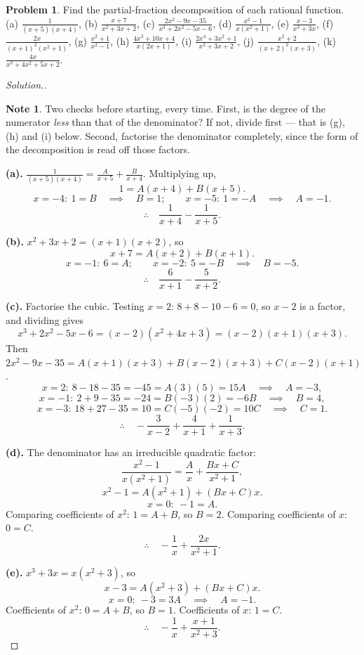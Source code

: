 \documentclass[11pt,a4paper]{article}
\theoremstyle{definition}
\newtheorem{note}[thm]{Note}
\newtheorem{problemx}{Problem}[section]
\newenvironment{problem}{\begin{problemx}}{\end{problemx}}
\newenvironment{solution}
  {\renewcommand{\qedsymbol}{}\begin{proof}[\textit{Solution}.]}
  {\end{proof}}
\begin{document}
\begin{problem}
Find the partial-fraction decomposition of each rational function.
\quad (a) $\frac{1}{(x+5)(x+4)}$, \quad (b) $\frac{x+7}{x^2+3x+2}$, \quad
(c) $\frac{2x^2-9x-35}{x^3+2x^2-5x-6}$, \quad (d) $\frac{x^2-1}{x\left(x^2+1\right)}$,
\quad (e) $\frac{x-3}{x^3+3x}$, \quad
(f) $\frac{2x}{(x+1)^2\left(x^2+1\right)}$, \quad (g) $\frac{x^2+1}{x^2-1}$, \quad
(h) $\frac{4x^3+10x+4}{x(2x+1)}$, \quad (i) $\frac{2x^4+3x^2+1}{x^2+3x+2}$, \quad
(j) $\frac{x^2+2}{(x+2)^2(x+3)}$, \quad (k) $\frac{4x}{x^3+4x^2+5x+2}$.
\end{problem}

\begin{solution}
\begin{note}
Two checks before starting, every time. First, is the degree of the numerator
\emph{less} than that of the denominator? If not, divide first --- that is (g), (h) and
(i) below. Second, factorise the denominator completely, since the form of the
decomposition is read off those factors.
\end{note}

\textbf{(a).} $\frac{1}{(x+5)(x+4)}=\frac{A}{x+5}+\frac{B}{x+4}$. Multiplying up,
$$1=A(x+4)+B(x+5).$$
$$x=-4:\ 1=B\quad\implies\quad B=1;\qquad x=-5:\ 1=-A\quad\implies\quad A=-1.$$
$$\therefore\quad \frac{1}{x+4}-\frac{1}{x+5}.$$

\textbf{(b).} $x^2+3x+2=(x+1)(x+2)$, so
$$x+7=A(x+2)+B(x+1).$$
$$x=-1:\ 6=A;\qquad x=-2:\ 5=-B\quad\implies\quad B=-5.$$
$$\therefore\quad \frac{6}{x+1}-\frac{5}{x+2}.$$

\textbf{(c).} Factorise the cubic. Testing $x=2$: $8+8-10-6=0$, so $x-2$ is a factor,
and dividing gives
$$x^3+2x^2-5x-6=(x-2)\left(x^2+4x+3\right)=(x-2)(x+1)(x+3).$$
Then $2x^2-9x-35=A(x+1)(x+3)+B(x-2)(x+3)+C(x-2)(x+1)$.
$$x=2:\ 8-18-35=-45=A(3)(5)=15A\quad\implies\quad A=-3,$$
$$x=-1:\ 2+9-35=-24=B(-3)(2)=-6B\quad\implies\quad B=4,$$
$$x=-3:\ 18+27-35=10=C(-5)(-2)=10C\quad\implies\quad C=1.$$
$$\therefore\quad -\frac{3}{x-2}+\frac{4}{x+1}+\frac{1}{x+3}.$$

\textbf{(d).} The denominator has an irreducible quadratic factor:
$$\frac{x^2-1}{x\left(x^2+1\right)}=\frac{A}{x}+\frac{Bx+C}{x^2+1},$$
$$x^2-1=A\left(x^2+1\right)+(Bx+C)x.$$
$$x=0:\ -1=A.$$
Comparing coefficients of $x^2$: $1=A+B$, so $B=2$. Comparing coefficients of $x$:
$0=C$.
$$\therefore\quad -\frac{1}{x}+\frac{2x}{x^2+1}.$$

\textbf{(e).} $x^3+3x=x\left(x^2+3\right)$, so
$$x-3=A\left(x^2+3\right)+(Bx+C)x.$$
$$x=0:\ -3=3A\quad\implies\quad A=-1.$$
Coefficients of $x^2$: $0=A+B$, so $B=1$. Coefficients of $x$: $1=C$.
$$\therefore\quad -\frac{1}{x}+\frac{x+1}{x^2+3}.$$


\end{solution}
\end{document}
